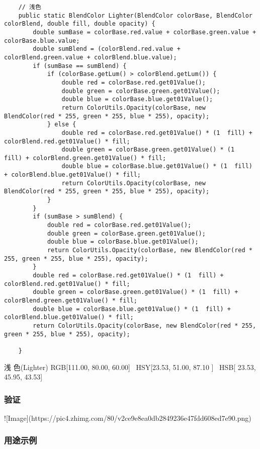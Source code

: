 \begin{lstlisting}
	// 浅色
	public static BlendColor Lighter(BlendColor colorBase, BlendColor colorBlend, double fill, double opacity) {
		double sumBase = colorBase.red.value + colorBase.green.value + colorBase.blue.value;
		double sumBlend = (colorBlend.red.value + colorBlend.green.value + colorBlend.blue.value);
		if (sumBase == sumBlend) {
			if (colorBase.getLum() > colorBlend.getLum()) {
				double red = colorBase.red.get01Value();
				double green = colorBase.green.get01Value();
				double blue = colorBase.blue.get01Value();
				return ColorUtils.Opacity(colorBase, new BlendColor(red * 255, green * 255, blue * 255), opacity);
			} else {
				double red = colorBase.red.get01Value() * (1  fill) + colorBlend.red.get01Value() * fill;
				double green = colorBase.green.get01Value() * (1  fill) + colorBlend.green.get01Value() * fill;
				double blue = colorBase.blue.get01Value() * (1  fill) + colorBlend.blue.get01Value() * fill;
				return ColorUtils.Opacity(colorBase, new BlendColor(red * 255, green * 255, blue * 255), opacity);
			}
		}
		if (sumBase > sumBlend) {
			double red = colorBase.red.get01Value();
			double green = colorBase.green.get01Value();
			double blue = colorBase.blue.get01Value();
			return ColorUtils.Opacity(colorBase, new BlendColor(red * 255, green * 255, blue * 255), opacity);
		}
		double red = colorBase.red.get01Value() * (1  fill) + colorBlend.red.get01Value() * fill;
		double green = colorBase.green.get01Value() * (1  fill) + colorBlend.green.get01Value() * fill;
		double blue = colorBase.blue.get01Value() * (1  fill) + colorBlend.blue.get01Value() * fill;
		return ColorUtils.Opacity(colorBase, new BlendColor(red * 255, green * 255, blue * 255), opacity);
		
	}
\end{lstlisting}





浅    色(Lighter)       RGB[111.00,  80.00,  60.00]~ HSY[23.53,  51.00,  87.10 ]~ HSB[ 23.53,  45.95,  43.53]


\subsubsection{ 验证}

![Image](https://pic4.zhimg.com/80/v2ce9e8ea0db2849236e47fdd608ed7e90.png)

\subsubsection{ 用途示例}

